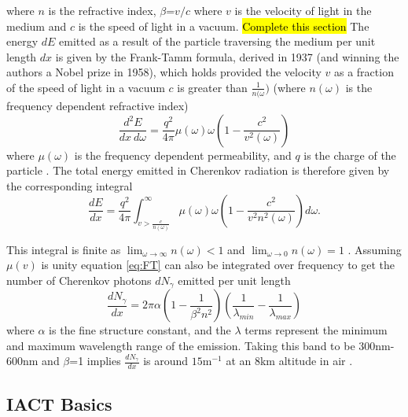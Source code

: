 where $n$ is the refractive index, $\beta$=$v/c$ where $v$ is the velocity of light in the medium and $c$ is the speed of light in a vacuum.
\hl{Complete this section}
The energy $dE$ emitted as a result of the particle traversing the medium per unit length $dx$ is given by the Frank-Tamm formula, derived in 1937 (and winning the authors a Nobel prize in 1958), which holds provided the velocity $v$ as a fraction of the speed of light in a vacuum $c$ is greater than $\frac{1}{n(\omega})$ (where $n(\omega)$ is the frequency dependent refractive index)
\begin{equation}
    \frac{d^2E}{dx\ d\omega}=\frac{q^2}{4\pi}\mu(\omega)\omega\left(1- \frac{c^2}{v^2(\omega)} \right)
    \label{eq:FT}
\end{equation}
where $\mu(\omega)$ is the frequency dependent permeability, and $q$ is the charge of the particle \cite{franktamm}. The total energy emitted in Cherenkov radiation is therefore given by the corresponding integral
\begin{equation}
    \frac{dE}{dx}=\frac{q^2}{4\pi}\int_{v>\frac{c}{n(\omega)}}^{\infty}\mu(\omega)\omega \left(1- \frac{c^2}{v^2n^2(\omega)} \right) d \omega .
    \label{eq:FT2}
\end{equation}

This integral is finite as $\lim_{\omega \to \infty} n(\omega)<1$ and $\lim_{\omega \to 0} n(\omega)=1$ . Assuming $\mu(v)$ is unity equation \ref{eq:FT} can also be integrated over frequency \cite{katz} to get the number of Cherenkov photons $dN_{\gamma}$ emitted per unit length
\begin{equation}
    \frac{dN_{\gamma}}{dx}=2\pi\alpha \left( 1- \frac{1}{\beta^2n^2} \right) \left(\frac{1}{\lambda_{min}}-\frac{1}{\lambda_{max}} \right)
\end{equation}
where $\alpha$ is the fine structure constant, and the $\lambda$ terms represent the minimum and maximum wavelength range of the emission. Taking this band to be 300nm-600nm and $\beta$=1 implies $\frac{dN_{\gamma}}{dx}$ is around $\mathrm{15 m^{-1}}$ at an 8km altitude in air \cite{katz}. 
\subsection{IACT Basics}

